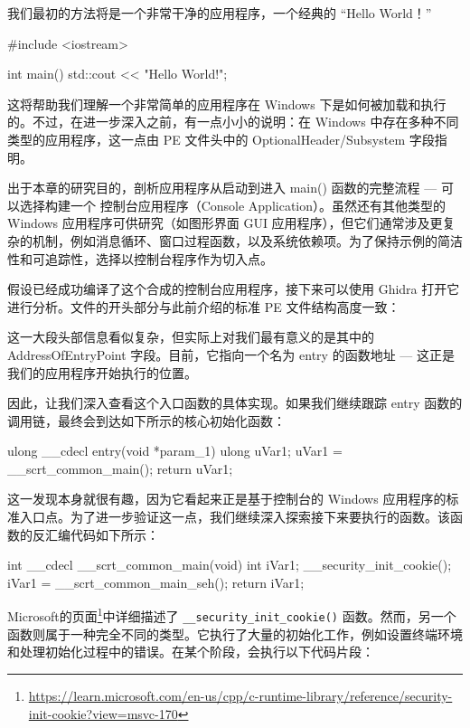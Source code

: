 
我们最初的方法将是一个非常干净的应用程序，一个经典的 “Hello World！”

\begin{cpp}
#include <iostream>

int main() {
  std::cout << "Hello World!\n";
}
\end{cpp}

这将帮助我们理解一个非常简单的应用程序在 Windows 下是如何被加载和执行的。不过，在进一步深入之前，有一点小小的说明：在 Windows 中存在多种不同类型的应用程序，这一点由 PE 文件头中的 OptionalHeader/Subsystem 字段指明。

出于本章的研究目的，剖析应用程序从启动到进入 main() 函数的完整流程 --- 可以选择构建一个 控制台应用程序（Console Application）。虽然还有其他类型的 Windows 应用程序可供研究（如图形界面 GUI 应用程序），但它们通常涉及更复杂的机制，例如消息循环、窗口过程函数，以及系统依赖项。为了保持示例的简洁性和可追踪性，选择以控制台程序作为切入点。

假设已经成功编译了这个合成的控制台应用程序，接下来可以使用 Ghidra 打开它进行分析。文件的开头部分与此前介绍的标准 PE 文件结构高度一致：


这一大段头部信息看似复杂，但实际上对我们最有意义的是其中的 AddressOfEntryPoint 字段。目前，它指向一个名为 entry 的函数地址 --- 这正是我们的应用程序开始执行的位置。

因此，让我们深入查看这个入口函数的具体实现。如果我们继续跟踪 entry 函数的调用链，最终会到达如下所示的核心初始化函数：

\begin{cpp}
ulong __cdecl entry(void *param_1) {
  ulong uVar1;
  uVar1 = __scrt_common_main();
  return uVar1;
}
\end{cpp}

这一发现本身就很有趣，因为它看起来正是基于控制台的 Windows 应用程序的标准入口点。为了进一步验证这一点，我们继续深入探索接下来要执行的函数。该函数的反汇编代码如下所示：

\begin{cpp}
int __cdecl __scrt_common_main(void) {
  int iVar1;
  __security_init_cookie();
  iVar1 = __scrt_common_main_seh();
  return iVar1;
}
\end{cpp}

Microsoft的页面\footnote{\url{https://learn.microsoft.com/en-us/cpp/c-runtime-library/reference/security-init-cookie?view=msvc-170}}中详细描述了 \verb|__security_init_cookie()| 函数。然而，另一个函数则属于一种完全不同的类型。它执行了大量的初始化工作，例如设置终端环境和处理初始化过程中的错误。在某个阶段，会执行以下代码片段：

